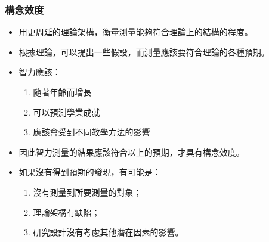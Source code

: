 \documentclass[xcolor=dvipsnames, 13pt]{beamer}
\begin{document}
\begin{frame}\frametitle{構念效度}
\begin{itemize}
\item 用更周延的理論架構，衡量測量能夠符合理論上的結構的程度。
\item 根據理論，可以提出一些假設，而測量應該要符合理論的各種預期。
\item 智力應該：
\begin{enumerate}
\item 隨著年齡而增長
\item 可以預測學業成就
\item 應該會受到不同教學方法的影響
\end{enumerate}
\item 因此智力測量的結果應該符合以上的預期，才具有構念效度。
\item 如果沒有得到預期的發現，有可能是：
\begin{enumerate}
\item 沒有測量到所要測量的對象；
\item 理論架構有缺陷；
\item 研究設計沒有考慮其他潛在因素的影響。
\end{enumerate}

\end{itemize}
\end{frame}
\end{document}
